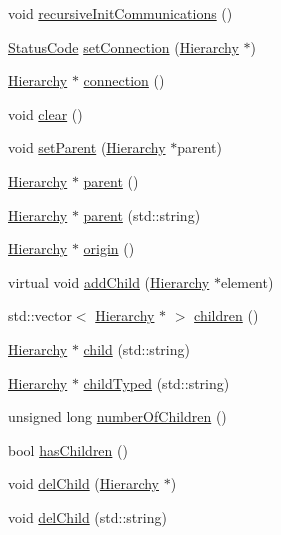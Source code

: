 \begin{DoxyCompactItemize}
\item 
void \hyperlink{classElement_a82119ed37dff76508a2746a853ec35ba}{recursiveInitCommunications} ()
\item 
\hyperlink{classStatusCode}{StatusCode} \hyperlink{classElement_ab476b4b1df5954141ceb14f072433b89}{setConnection} (\hyperlink{classHierarchy}{Hierarchy} $\ast$)
\item 
\hyperlink{classHierarchy}{Hierarchy} $\ast$ \hyperlink{classElement_af57444353c1ddf9fa0109801e97debf7}{connection} ()
\item 
void \hyperlink{classHierarchy_af4d43b0765b402670eed2d62c73405af}{clear} ()
\item 
void \hyperlink{classHierarchy_a585ad1aeec16077a0e532ab8b4fc557b}{setParent} (\hyperlink{classHierarchy}{Hierarchy} $\ast$parent)
\item 
\hyperlink{classHierarchy}{Hierarchy} $\ast$ \hyperlink{classHierarchy_a1c7bec8257e717f9c1465e06ebf845fc}{parent} ()
\item 
\hyperlink{classHierarchy}{Hierarchy} $\ast$ \hyperlink{classHierarchy_ad550588733bf75ac5c0fcfd7c8fd11a6}{parent} (std::string)
\item 
\hyperlink{classHierarchy}{Hierarchy} $\ast$ \hyperlink{classHierarchy_aee461dc930ce3871636ff87f075b1b83}{origin} ()
\item 
virtual void \hyperlink{classHierarchy_ad677774ff38fcb257c04a3a10d471fac}{addChild} (\hyperlink{classHierarchy}{Hierarchy} $\ast$element)
\item 
std::vector$<$ \hyperlink{classHierarchy}{Hierarchy} $\ast$ $>$ \hyperlink{classHierarchy_aa9a76f69e98e052ee1a6e32cea006288}{children} ()
\item 
\hyperlink{classHierarchy}{Hierarchy} $\ast$ \hyperlink{classHierarchy_a1e207f973c694b538bf90107b4868817}{child} (std::string)
\item 
\hyperlink{classHierarchy}{Hierarchy} $\ast$ \hyperlink{classHierarchy_a0c15a5276a3b80b4354d6bd8a01e0708}{childTyped} (std::string)
\item 
unsigned long \hyperlink{classHierarchy_ab16e84de65fd84e14001a6cf941c8be4}{numberOfChildren} ()
\item 
bool \hyperlink{classHierarchy_a255174fe4d316d2a3f430dcb9dab29f1}{hasChildren} ()
\item 
void \hyperlink{classHierarchy_a2b2b359fac003233f65786a616766bde}{delChild} (\hyperlink{classHierarchy}{Hierarchy} $\ast$)
\item 
void \hyperlink{classHierarchy_a1928ac7615fe0b5e55cd707f70dc6781}{delChild} (std::string)

\end{DoxyCompactItemize}
